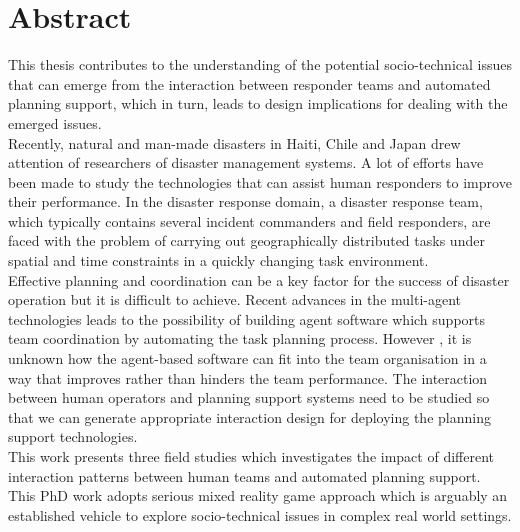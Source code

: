 \begingroup
\let\clearpage\relax
\let\cleardoublepage\relax
\let\cleardoublepage\relax

\chapter*{Abstract}
This thesis contributes to the understanding of the potential socio-technical issues that can emerge from the interaction between responder teams and automated planning support, which in turn, leads to design implications for dealing with the emerged issues. \\

Recently, natural and man-made disasters in Haiti, Chile and Japan drew attention of researchers of disaster management systems. A lot of efforts have been made to study the technologies that can assist human responders to improve their performance. In the disaster response domain,  a disaster response team, which typically contains several incident commanders and field responders, are faced with the problem of carrying out geographically distributed tasks under spatial and time constraints in a quickly changing task environment. \\ 

Effective planning and coordination can be a key factor for the success of disaster operation but it is difficult to achieve. Recent advances in the multi-agent technologies leads to the possibility of building agent software which supports team coordination by automating the task planning process. However , it is unknown how the agent-based software can fit into the team organisation in a way that improves rather than hinders the team performance. The interaction between human operators and planning support systems need to be studied so that we can generate appropriate interaction design for deploying the planning support technologies.\\

This work presents three field studies which investigates the impact of different interaction patterns between human teams and automated  planning support. This PhD work adopts serious mixed reality game approach which is arguably an established vehicle to explore socio-technical issues in complex real world settings.\\

